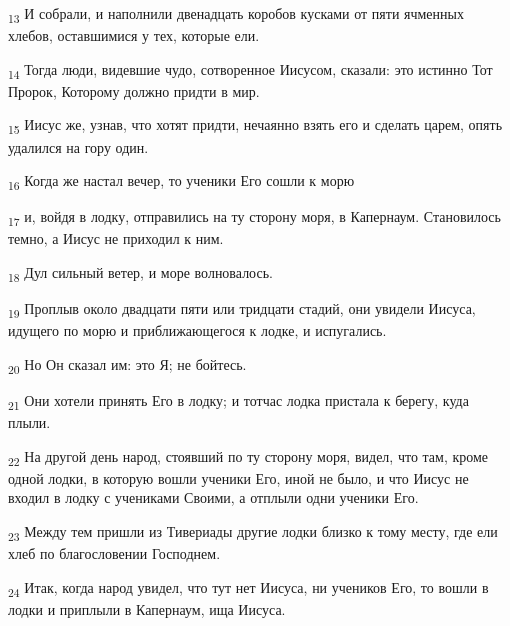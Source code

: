 \begin{tcolorbox}
\textsubscript{13} И собрали, и наполнили двенадцать коробов кусками от пяти ячменных хлебов, оставшимися у тех, которые ели.
\end{tcolorbox}
\begin{tcolorbox}
\textsubscript{14} Тогда люди, видевшие чудо, сотворенное Иисусом, сказали: это истинно Тот Пророк, Которому должно придти в мир.
\end{tcolorbox}
\begin{tcolorbox}
\textsubscript{15} Иисус же, узнав, что хотят придти, нечаянно взять его и сделать царем, опять удалился на гору один.
\end{tcolorbox}
\begin{tcolorbox}
\textsubscript{16} Когда же настал вечер, то ученики Его сошли к морю
\end{tcolorbox}
\begin{tcolorbox}
\textsubscript{17} и, войдя в лодку, отправились на ту сторону моря, в Капернаум. Становилось темно, а Иисус не приходил к ним.
\end{tcolorbox}
\begin{tcolorbox}
\textsubscript{18} Дул сильный ветер, и море волновалось.
\end{tcolorbox}
\begin{tcolorbox}
\textsubscript{19} Проплыв около двадцати пяти или тридцати стадий, они увидели Иисуса, идущего по морю и приближающегося к лодке, и испугались.
\end{tcolorbox}
\begin{tcolorbox}
\textsubscript{20} Но Он сказал им: это Я; не бойтесь.
\end{tcolorbox}
\begin{tcolorbox}
\textsubscript{21} Они хотели принять Его в лодку; и тотчас лодка пристала к берегу, куда плыли.
\end{tcolorbox}
\begin{tcolorbox}
\textsubscript{22} На другой день народ, стоявший по ту сторону моря, видел, что там, кроме одной лодки, в которую вошли ученики Его, иной не было, и что Иисус не входил в лодку с учениками Своими, а отплыли одни ученики Его.
\end{tcolorbox}
\begin{tcolorbox}
\textsubscript{23} Между тем пришли из Тивериады другие лодки близко к тому месту, где ели хлеб по благословении Господнем.
\end{tcolorbox}
\begin{tcolorbox}
\textsubscript{24} Итак, когда народ увидел, что тут нет Иисуса, ни учеников Его, то вошли в лодки и приплыли в Капернаум, ища Иисуса.
\end{tcolorbox}
